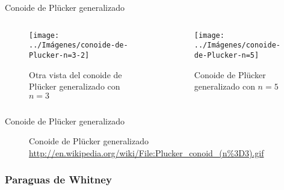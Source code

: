 \documentclass[10pt]{beamer}
\begin{document}
	\begin{frame}{Conoide de Plücker generalizado}
		\begin{columns}[b] %
			\begin{column}{.50\textwidth}
				\begin{figure}
					\centering
					\texttt{[image: ../Imágenes/conoide-de-Plucker-n=3-2]}
					\caption{Otra vista del conoide de Plücker generalizado con $n=3$}
					\label{fig:conoide-de-Plücker-generalizado-2}
				\end{figure}
			\end{column}%
			\hfill%
			\begin{column}{.50\textwidth}
					\begin{figure}
						\centering
						\texttt{[image: ../Imágenes/conoide-de-Plucker-n=5]}
						\caption{Conoide de Plücker generalizado con $n=5$}
						\label{fig:conoide-de-Plucker-generalizado-3}
					\end{figure}
			\end{column}%
		\end{columns}
	\end{frame}
	
	\begin{frame}{Conoide de Plücker generalizado}
	
		
		\begin{figure}
				\centering
				\caption{Conoide de Plücker generalizado \url{http://en.wikipedia.org/wiki/File:Plucker_conoid_(n\%3D3).gif}}
				\label{fig:conoide-de-Plücker-generalizado-gif}
		\end{figure}
	\end{frame}
	
	\subsubsection{Paraguas de Whitney}
	
\end{document}
